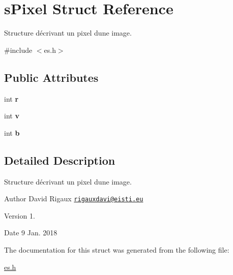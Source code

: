 \hypertarget{structs_pixel}{}\section{s\+Pixel Struct Reference}
\label{structs_pixel}


Structure décrivant un pixel d\textquotesingle{}une image.  




{\ttfamily \#include $<$es.\+h$>$}

\subsection*{Public Attributes}
\begin{DoxyCompactItemize}
\item 
\mbox{\label{structs_pixel_ac3c26bdba7b18fa49fef852d541fa03e}} 
int {\bfseries r}
\item 
\mbox{\label{structs_pixel_a95838ecdec0ab8ef4c09340763b09040}} 
int {\bfseries v}
\item 
\mbox{\label{structs_pixel_a17afc2137cca0a7d025256c9577907c2}} 
int {\bfseries b}
\end{DoxyCompactItemize}


\subsection{Detailed Description}
Structure décrivant un pixel d\textquotesingle{}une image. 

\begin{DoxyAuthor}{Author}
David Rigaux \href{mailto:rigauxdavi@eisti.eu}{\tt rigauxdavi@eisti.\+eu} 
\end{DoxyAuthor}
\begin{DoxyVersion}{Version}
1. 
\end{DoxyVersion}
\begin{DoxyDate}{Date}
9 Jan. 2018 
\end{DoxyDate}


The documentation for this struct was generated from the following file\+:\begin{DoxyCompactItemize}
\item 
\mbox{\hyperlink{es_8h}{es.\+h}}\end{DoxyCompactItemize}
